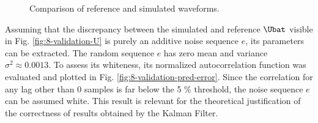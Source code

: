 \begin{figure}[hbp]
    \caption{Comparison of reference and simulated waveforms.}
    \label{fig:8-validation}
\end{figure}

Assuming that the discrepancy between the simulated and reference $\Ubat$ visible in Fig. \ref{fig:8-validation-U} is purely an additive noise sequence $e$, its parameters can be extracted. The random sequence $e$ has zero mean and variance $\sigma^2 \approx 0.0013$. To assess its whiteness, its normalized autocorrelation function was evaluated and plotted in Fig. \ref{fig:8-validation-pred-error}. Since the correlation for any lag other than 0 samples is far below the 5 \% threshold, the noise sequence $e$ can be assumed white. This result is relevant for the theoretical justification of the correctness of results obtained by the Kalman Filter.


